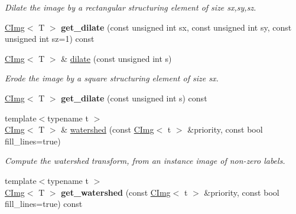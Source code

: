 \begin{DoxyCompactItemize}
\begin{DoxyCompactList}\small\item\em Dilate the image by a rectangular structuring element of size sx,sy,sz. \item\end{DoxyCompactList}\item 
\hypertarget{structcimg__library_1_1CImg_abb3d02298a40596290f709fcdf6523cb}{
\hyperlink{structcimg__library_1_1CImg}{CImg}$<$ T $>$ {\bfseries get\_\-dilate} (const unsigned int sx, const unsigned int sy, const unsigned int sz=1) const }
\label{structcimg__library_1_1CImg_abb3d02298a40596290f709fcdf6523cb}

\item 
\hypertarget{structcimg__library_1_1CImg_a5e7ef93c5f89752288f5b6db5c896193}{
\hyperlink{structcimg__library_1_1CImg}{CImg}$<$ T $>$ \& \hyperlink{structcimg__library_1_1CImg_a5e7ef93c5f89752288f5b6db5c896193}{dilate} (const unsigned int s)}
\label{structcimg__library_1_1CImg_a5e7ef93c5f89752288f5b6db5c896193}

\begin{DoxyCompactList}\small\item\em Erode the image by a square structuring element of size sx. \item\end{DoxyCompactList}\item 
\hypertarget{structcimg__library_1_1CImg_a9f7817b97de7e7499c71ed52e056ed73}{
\hyperlink{structcimg__library_1_1CImg}{CImg}$<$ T $>$ {\bfseries get\_\-dilate} (const unsigned int s) const }
\label{structcimg__library_1_1CImg_a9f7817b97de7e7499c71ed52e056ed73}

\item 
\hypertarget{structcimg__library_1_1CImg_a7d04de5138c61c5cb1d0366702b4244b}{
{\footnotesize template$<$typename t $>$ }\\\hyperlink{structcimg__library_1_1CImg}{CImg}$<$ T $>$ \& \hyperlink{structcimg__library_1_1CImg_a7d04de5138c61c5cb1d0366702b4244b}{watershed} (const \hyperlink{structcimg__library_1_1CImg}{CImg}$<$ t $>$ \&priority, const bool fill\_\-lines=true)}
\label{structcimg__library_1_1CImg_a7d04de5138c61c5cb1d0366702b4244b}

\begin{DoxyCompactList}\small\item\em Compute the watershed transform, from an instance image of non-\/zero labels. \item\end{DoxyCompactList}\item 
\hypertarget{structcimg__library_1_1CImg_aa7fd449200c9ac8e72063c6b62bc1383}{
{\footnotesize template$<$typename t $>$ }\\\hyperlink{structcimg__library_1_1CImg}{CImg}$<$ T $>$ {\bfseries get\_\-watershed} (const \hyperlink{structcimg__library_1_1CImg}{CImg}$<$ t $>$ \&priority, const bool fill\_\-lines=true) const }
\label{structcimg__library_1_1CImg_aa7fd449200c9ac8e72063c6b62bc1383}


\end{DoxyCompactItemize}
